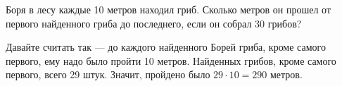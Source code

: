 \documentclass[10pt]{scrbook} \usepackage{modules/nonstahp_book}
\begin{document}
\renewcommand{\theyear}{2014}




\begin{itemize}

	\itA Боря в лесу каждые 10 метров находил гриб. Сколько метров он прошел от первого найденного гриба до последнего, если он собрал 30 грибов?
	
	\itr Давайте считать так — до каждого найденного Борей гриба, кроме самого первого, ему надо было пройти 10 метров. Найденных грибов, кроме самого первого, всего 29 штук. Значит, пройдено было $29 \cdot 10 = 290$ метров.

\end{itemize}
\end{document}
